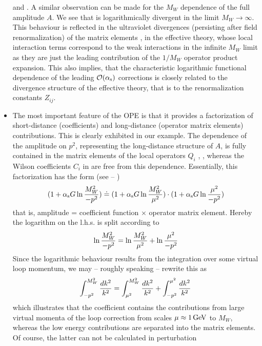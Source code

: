 \begin{itemize}
and .  A similar observation can be made for the $M_W$
dependence of the full amplitude $A$. We see that  is
logarithmically divergent in the limit $M_W\to\infty$. This behaviour
is reflected in the ultraviolet divergences (persisting after field
renormalization) of the matrix elements ,  in the
effective theory, whose local interaction terms correspond to the weak
interactions in the infinite $M_W$ limit as they are just the leading
contribution of the $1/M_W$ operator product expansion.  This also
implies, that the characteristic logarithmic functional dependence of
the leading ${\cal O}(\alpha_{\rm s})$ corrections is closely related to the
divergence structure of the effective theory, that is to the
renormalization constants $Z_{ij}$.
\item The most important feature of the OPE is that it provides a
factorization of short-distance (coefficients) and long-distance
(operator matrix elements) contributions. This is clearly exhibited
in our example. The dependence of the amplitude  on $p^2$,
representing the long-distance structure of $A$, is fully contained
in the matrix elements of the local operators $Q_i$ , ,
whereas the Wilson coefficients $C_i$ in  are free from this
dependence. Essentially, this factorization has the form
(see  -- )
\begin{equation}\label{fact}
(1+\alpha_{\rm s} G \ln{M^2_W\over -p^2})\doteq
(1+\alpha_{\rm s} G \ln{M^2_W\over\mu^2})\cdot
(1+\alpha_{\rm s} G \ln{\mu^2\over -p^2})        \end{equation}
that is, amplitude = coefficient function $\times$ operator matrix
element. Hereby the logarithm on the l.h.s. is split according to
\begin{equation}\label{splt}
\ln{M^2_W\over -p^2}=\ln{M^2_W\over\mu^2}+ \ln{\mu^2\over -p^2}  \end{equation}
Since the logarithmic behaviour results from the integration over
some virtual loop momentum, we may -- roughly speaking -- rewrite
this as
\begin{equation}\label{pmuw}
\int^{M^2_W}_{-p^2}{d k^2\over k^2}=
\int^{M^2_W}_{\mu^2}{d k^2\over k^2} +
\int^{\mu^2}_{-p^2}{d k^2\over k^2}   \end{equation}
which illustrates that the coefficient contains the contributions
from large virtual momenta of the loop correction from scales
$\mu\approx 1\, {\rm GeV}$ to $M_W$, whereas the low energy contributions are
separated into the matrix elements.\\
Of course, the latter can not be calculated in perturbation

\end{itemize}
